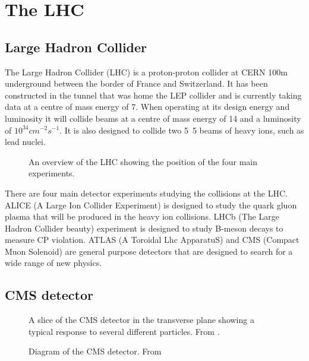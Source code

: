 \chapter{The LHC}
\section{Large Hadron Collider}
The Large Hadron Collider (LHC) is a proton-proton collider at CERN 100m
underground between the border of France and Switzerland.
It has been constructed in the tunnel that was home the LEP collider and is
currently taking data at a centre of mass energy of \unit{7}{\TeV}. 
When operating at its design energy and luminosity it will collide beams at a
centre of mass energy of \unit{14}{\TeV} and a luminosity of $10^34
cm^{-2}s^{-1}$.  
It is also designed to collide two \unit{5.5}{\TeV} beams of heavy ions, such
as lead nuclei.\cite{lhc}

\begin{figure}[htb!]
  \centering
  \caption{An overview of the LHC showing the position of the four main experiments.}
  \label{fig:LHC}
\end{figure}

There are four main detector experiments studying the collisions at the LHC. 
ALICE (A Large Ion Collider Experiment) is designed to study the quark gluon
plasma that will be produced in the heavy ion collisions. 
LHCb (The Large Hadron Collider beauty) experiment is designed to study B-meson
decays to measure CP violation. 
ATLAS (A Toroidal Lhc ApparatuS) and CMS (Compact Muon Solenoid) are general
purpose detectors that are designed 
to search for a wide range of new physics.\cite{lhc}

\section{CMS detector}

\begin{figure}[htb!]
  \centering
  \caption{A slice of the CMS detector in the transverse plane showing a
  \label{fig:CMS_Slice}
typical response to several different particles. 
From \cite{cmsSlice}.}
\end{figure}

\begin{figure}[htb!]
  \centering
  \caption{Diagram of the CMS detector. From \cite{cms}}
  \label{fig:CMSnc}
\end{figure}

